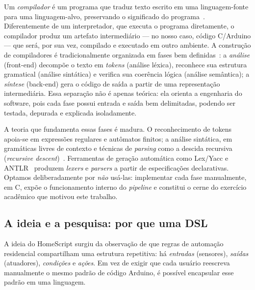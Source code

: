 \documentclass[conference]{IEEEtran}
\begin{document}
Um \emph{compilador} é um programa que traduz texto escrito em uma
linguagem-fonte para uma linguagem-alvo, preservando o significado do
programa~\cite{aho2006,cooper2011}. Diferentemente de um interpretador,
que executa o programa diretamente, o compilador produz um artefato
intermediário --- no nosso caso, código C/Arduino --- que será, por sua
vez, compilado e executado em outro ambiente. A construção de
compiladores é tradicionalmente organizada em fases bem
definidas~\cite{aho2006,grune2012,appel1998}: a \emph{análise} (front-end)
decompõe o texto em \emph{tokens} (análise léxica), reconhece sua
estrutura gramatical (análise sintática) e verifica sua coerência lógica
(análise semântica); a \emph{síntese} (back-end) gera o código de saída a
partir de uma representação intermediária. Essa separação não é apenas
teórica: ela orienta a engenharia do software, pois cada fase possui
entrada e saída bem delimitadas, podendo ser testada, depurada e
explicada isoladamente.

A teoria que fundamenta essas fases é madura. O reconhecimento de tokens
apoia-se em expressões regulares e autômatos finitos; a análise sintática,
em gramáticas livres de contexto e técnicas de \emph{parsing} como a
descida recursiva (\emph{recursive descent})~\cite{wirth1976}. Ferramentas
de geração automática como Lex/Yacc e ANTLR~\cite{parr2013} produzem
\emph{lexers} e \emph{parsers} a partir de especificações declarativas.
Optamos deliberadamente por \emph{não} usá-las: implementar cada fase
manualmente, em C, expõe o funcionamento interno do \emph{pipeline} e
constitui o cerne do exercício acadêmico que motivou este trabalho.

\subsection{A ideia e a pesquisa: por que uma DSL}

A ideia do HomeScript surgiu da observação de que regras de automação
residencial compartilham uma estrutura repetitiva: há \emph{entradas}
(sensores), \emph{saídas} (atuadores), \emph{condições} e \emph{ações}.
Em vez de exigir que cada usuário reescreva manualmente o mesmo padrão de
código Arduino, é possível encapsular esse padrão em uma linguagem.
\end{document}
